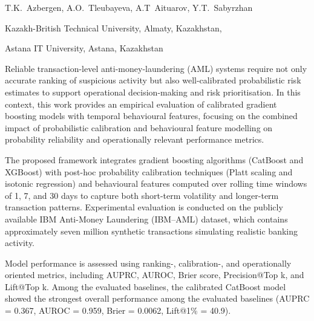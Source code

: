 
\begin{header}

T.K.~Azbergen,
A.O.~Tleubayeva\envelope,
A.T~Aituarov,
Y.T.~Sabyrzhan
\end{header}

\begin{affil}
Kazakh-British Technical University, Almaty, Kazakhstan,

Astana IT University, Astana, Kazakhstan

\end{affil}

Reliable transaction-level anti-money-laundering (AML) systems require
not only accurate ranking of suspicious activity but also
well-calibrated probabilistic risk estimates to support operational
decision-making and risk prioritisation. In this context, this work
provides an empirical evaluation of calibrated gradient boosting models
with temporal behavioural features, focusing on the combined impact of
probabi\-listic calibration and behavioural feature modelling on
probability reliability and operationally relevant performance metrics.

The proposed framework integrates gradient boosting algorithms (CatBoost
and XGBoost) with post-hoc probability calibration techniques (Platt
scaling and isotonic regression) and behavioural features computed over
rolling time windows of 1, 7, and 30 days to capture both short-term
volatility and longer-term transaction patterns. Experimental evaluation
is conducted on the publicly available IBM Anti-Money Laundering
(IBM--AML) dataset, which contains approximately seven million synthetic
transac\-tions simulating realistic banking activity.

Model performance is assessed using ranking-, calibration-, and
operationally oriented metrics, includ\-ing AUPRC, AUROC, Brier score,
Precision@Top k, and Lift@Top k. Among the evaluated baselines, the
calibrated CatBoost model showed the strongest overall performance among
the evaluated baselines (AUPRC = 0.367, AUROC = 0.959, Brier = 0.0062,
Lift@1\% = 40.9).

